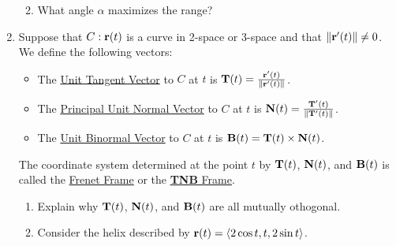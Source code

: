 \documentclass[12pt]{article}
\newif\ifans
\begin{document}
\begin{enumerate}
\begin{enumerate}
\newpage

\item What angle $\alpha$ maximizes the range?

\ifans{\fbox{\parbox{1\linewidth}{In part (e), we have already computed the range to be $\frac{v_0^2}{g}\sin{(2\alpha)}$.  This is maximized when $\sin(2\alpha)=1$; i.e., when $\alpha =\frac{\pi}{4}$
}}} \fi

\end{enumerate}

\item Suppose that $C:{\bf r}(t)$ is a curve in 2-space or 3-space and that $\|{\bf r}^{\prime}(t)\|\neq 0$.  We define the following vectors:
\begin{itemize}

\item The \underline{Unit Tangent Vector} to $C$ at $t$ is ${\bf T}(t)=\frac{{\bf r}^{\prime}(t)}{\|{\bf r}^{\prime}(t)\|}$.

\item The \underline{Principal Unit Normal Vector} to $C$ at $t$ is ${\bf N}(t)=\frac{{\bf T}^{\prime}(t)}{\|{\bf T}^{\prime}(t)\|}$.

\item The \underline{Unit Binormal Vector} to $C$ at $t$ is ${\bf B}(t)={\bf T}(t)\times {\bf N}(t)$.

\end{itemize}

The coordinate system determined at the point $t$ by ${\bf T}(t)$, ${\bf N}(t)$, and ${\bf B}(t)$ is called the \underline{Frenet Frame} or the \underline{{\bf TNB} Frame}.

\begin{enumerate}

\item Explain why ${\bf T}(t)$, ${\bf N}(t)$, and ${\bf B}(t)$ are all mutually othogonal.

\ifans{\fbox{\parbox{1\linewidth}{${\bf N}(t)\perp {\bf T}(t)$ by problem 9.  ${\bf B}(t) \perp {\bf N}(t)$ and ${\bf B}(t) \perp {\bf T}(t)$ because for any vectors in three space ${\bf v} \cdot ({\bf v}\times{\bf w})=0$ and ${\bf w} \cdot ({\bf v}\times{\bf w})=0$}}} \fi

\item Consider the helix described by ${\bf r}(t)=\langle 2 \cos{t}, t, 2\sin{t} \rangle$.


\end{enumerate}
\end{enumerate}
\end{document}
